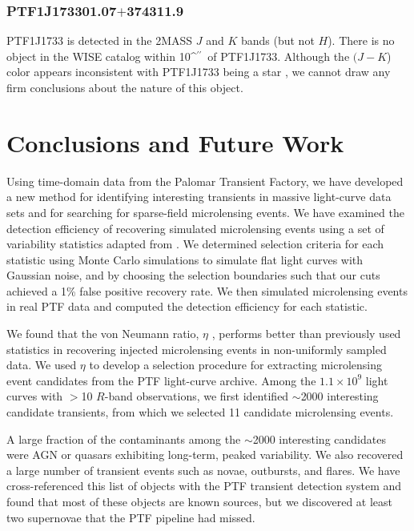 \documentclass{emulateapj}
\def\asec{\ifmmode^{\prime\prime}\else$^{\prime\prime}$\fi}
\begin{document}
\subsubsection*{PTF1J173301.07$+$374311.9} %
PTF1J1733 is detected in the 2MASS $J$ and $K$ bands (but not $H$). There is no object in the WISE catalog within 10\asec\ of PTF1J1733. Although the $(J-K$) color appears inconsistent with PTF1J1733 being a star \citep{kev07}, we cannot draw any firm conclusions about the nature of this object. 

\section{Conclusions and Future Work}\label{sec:conc}
Using time-domain data from the Palomar Transient Factory, we have developed a new method for identifying interesting transients in massive light-curve data sets and for searching for sparse-field microlensing events. We have examined the detection efficiency of recovering simulated microlensing events using a set of variability statistics adapted from \citet{shin2009}. We determined selection criteria for each statistic using Monte Carlo simulations to simulate flat light curves with Gaussian noise, and by choosing the selection boundaries such that our cuts achieved a 1\% false positive recovery rate. We then simulated microlensing events in real PTF data and computed the detection efficiency for each statistic. 

We found that the von Neumann ratio, $\eta$ \citep{von_neumann1941}, performs better than previously used statistics in recovering injected microlensing events in non-uniformly sampled data. We used $\eta$ to develop a selection procedure for extracting microlensing event candidates from the PTF light-curve archive. Among the $1.1 \times 10^9$ light curves with $>$10 $R$-band observations, we first identified $\sim$2000 interesting candidate transients, from which we selected 11 candidate microlensing events.

A large fraction of the contaminants among the $\sim$2000 interesting candidates were AGN or quasars exhibiting long-term, peaked variability. We also recovered a large number of transient events such as novae, outbursts, and flares. We have cross-referenced this list of objects with the PTF transient detection system and found that most of these objects are known sources, but we discovered at least two supernovae that the PTF pipeline had missed. 
\end{document}
